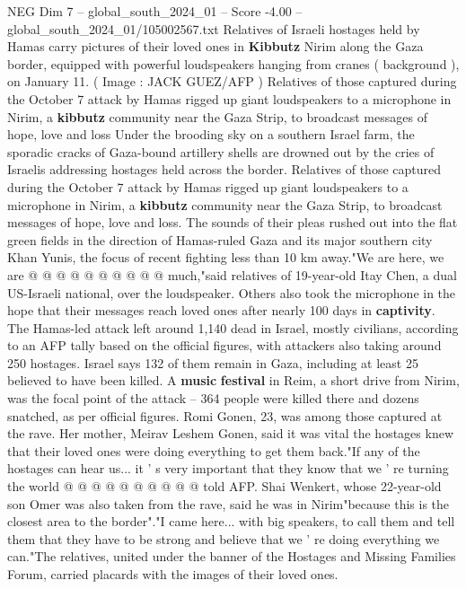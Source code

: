 \begin{textsample}{NEG Dim 7 – global\_south\_2024\_01 – Score -4.00 – global\_south\_2024\_01/105002567.txt}  \label{ex:f7_neg_406}
Relatives of Israeli hostages held by Hamas carry pictures of their loved ones in \textbf{Kibbutz} Nirim along the Gaza border, equipped with powerful loudspeakers hanging from cranes ( background ), on January 11. ( Image : JACK GUEZ/AFP ) Relatives of those captured during the October 7 attack by Hamas rigged up giant loudspeakers to a microphone in Nirim, a \textbf{kibbutz} community near the Gaza Strip, to broadcast messages of hope, love and loss Under the brooding sky on a southern Israel farm, the sporadic cracks of Gaza-bound artillery shells are drowned out by the cries of Israelis addressing hostages held across the border.
Relatives of those captured during the October 7 attack by Hamas rigged up giant loudspeakers to a microphone in Nirim, a \textbf{kibbutz} community near the Gaza Strip, to broadcast messages of hope, love and loss.
The sounds of their pleas rushed out into the flat green fields in the direction of Hamas-ruled Gaza and its major southern city Khan Yunis, the focus of recent fighting less than 10 km away."We are here, we are @ @ @ @ @ @ @ @ @ @ much,"said relatives of 19-year-old Itay Chen, a dual US-Israeli national, over the loudspeaker.
Others also took the microphone in the hope that their messages reach loved ones after nearly 100 days in \textbf{captivity}.
The Hamas-led attack left around 1,140 dead in Israel, mostly civilians, according to an AFP tally based on the official figures, with attackers also taking around 250 hostages.
Israel says 132 of them remain in Gaza, including at least 25 believed to have been killed.
A \textbf{music} \textbf{festival} in Reim, a short drive from Nirim, was the focal point of the attack -- 364 people were killed there and dozens snatched, as per official figures.
Romi Gonen, 23, was among those captured at the rave.
Her mother, Meirav Leshem Gonen, said it was vital the hostages knew that their loved ones were doing everything to get them back."If any of the hostages can hear us... it ' s very important that they know that we ' re turning the world @ @ @ @ @ @ @ @ @ @ told AFP.
Shai Wenkert, whose 22-year-old son Omer was also taken from the rave, said he was in Nirim"because this is the closest area to the border"."I came here... with big speakers, to call them and tell them that they have to be strong and believe that we ' re doing everything we can."The relatives, united under the banner of the Hostages and Missing Families Forum, carried placards with the images of their loved ones.

\end{textsample}
